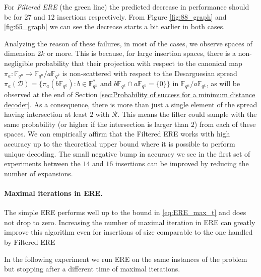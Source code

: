 \documentclass{article}
\newcommand{\Fqn}{\mathbb{F}_{q^n}}
\newcommand{\Fqk}{\mathbb{F}_{q^k}}
\newcommand{\calD}{\mathcal{D}}
\newcommand{\calR}{\mathcal{R}}
\begin{document}
For \textit{Filtered ERE} (the green line) the predicted decrease in performance should be for $27$ and $12$ insertions respectively.
From Figure \ref{fig:88_graph} and \ref{fig:65_graph} we can see the decrease starts a bit earlier in both cases.

Analyzing the reason of these failures, in most of the cases, we observe spaces of dimension $2k$ or more. This is because, for large insertion spaces, there is a non-negligible probability that their projection with respect to the canonical map $\pi_a\colon\Fqn\to\Fqn/a\Fqk$ is non-scattered with respect to the Desarguesian spread $\pi_a(\bm{\calD})=\{\pi_a(b\Fqk) \colon b\in\Fqn^*\text{ and } b\Fqk\cap a\Fqk=\{0\}\}$ in $\Fqn/a\Fqk$, as will be observed at the end of Section \ref{sec:Probability of success for a minimum distance decoder}.
As a consequence, there is more than just a single element of the spread having intersection at least $2$ with $\calR$.
This means the filter could sample with the same probability (or higher if the intersection is larger than $2$) from each of these spaces.
We can empirically affirm that the Filtered ERE works with high accuracy up to the theoretical upper bound where it is possible to perform unique decoding.
The small negative bump in accuracy we see in the first set of experiments between the $14$ and $16$ insertions can be improved by reducing the number of expansions.



\paragraph{Maximal iterations in ERE.}
The simple ERE performs well up to the bound in \eqref{eq:ERE_max_t} and does not drop to zero. Increasing the number of maximal iteration in ERE can greatly improve this algorithm even for insertions of size comparable to the one handled by Filtered ERE

In the following experiment we run ERE on the same instances of the problem but stopping after a different time of maximal iterations.
\end{document}
